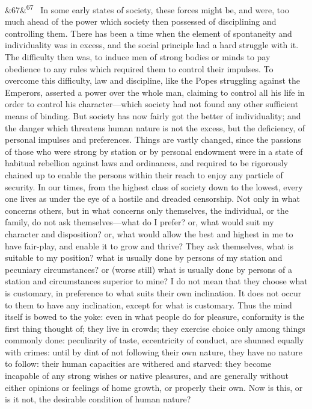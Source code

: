 \documentclass[12pt]{article}
\newcommand{\para}[1][]{\par\noindent\ifx&#1&\else\textsuperscript{\footnotesize #1}~\fi}
\begin{document}
\para[67] In some early states of society, these forces might be, and were, too much ahead of the power which society then possessed of disciplining and controlling them. There has been a time when the element of spontaneity and individuality was in excess, and the social principle had a hard struggle with it. The difficulty then was, to induce men of strong bodies or minds to pay obedience to any rules which required them to control their impulses. To overcome this difficulty, law and discipline, like the Popes struggling against the Emperors, asserted a power over the whole man, claiming to control all his life in order to control his character---which society had not found any other sufficient means of binding. But society has now fairly got the better of individuality; and the danger which threatens human nature is not the excess, but the deficiency, of personal impulses and preferences. Things are vastly changed, since the passions of those who were strong by station or by personal endowment were in a state of habitual rebellion against laws and ordinances, and required to be rigorously chained up to enable the persons within their reach to enjoy any particle of security. In our times, from the highest class of society down to the lowest, every one lives as under the eye of a hostile and dreaded censorship. Not only in what concerns others, but in what concerns only themselves, the individual, or the family, do not ask themselves---what do I prefer? or, what would suit my character and disposition? or, what would allow the best and highest in me to have fair-play, and enable it to grow and thrive? They ask themselves, what is suitable to my position? what is usually done by persons of my station and pecuniary circumstances? or (worse still) what is usually done by persons of a station and circumstances superior to mine? I do not mean that they choose what is customary, in preference to what suits their own inclination. It does not occur to them to have any inclination, except for what is customary. Thus the mind itself is bowed to the yoke: even in what people do for pleasure, conformity is the first thing thought of; they live in crowds; they exercise choice only among things commonly done: peculiarity of taste, eccentricity of conduct, are shunned equally with crimes: until by dint of not following their own nature, they have no nature to follow: their human capacities are withered and starved: they become incapable of any strong wishes or native pleasures, and are generally without either opinions or feelings of home growth, or properly their own. Now is this, or is it not, the desirable condition of human nature?
\end{document}
